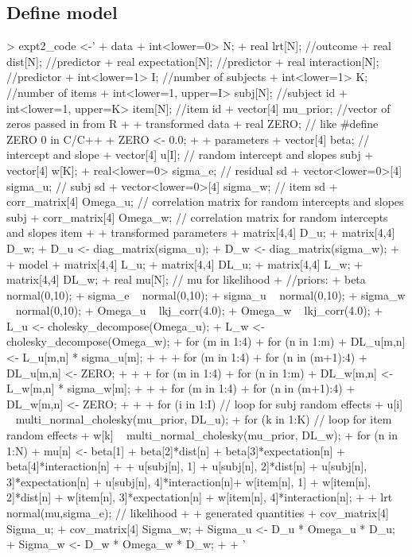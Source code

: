 \documentclass{article}
\begin{document}
\subsection{Define model}

\begin{Schunk}
\begin{Sinput}
> expt2_code <-'
+ data {
+     int<lower=0> N;
+     real lrt[N];                     //outcome
+ real dist[N];                     //predictor
+ real expectation[N];                     //predictor
+ real interaction[N];                     //predictor
+ int<lower=1> I;                 //number of subjects
+ int<lower=1> K;                 //number of items
+ int<lower=1, upper=I> subj[N];    //subject id
+ int<lower=1, upper=K> item[N];    //item id
+ vector[4] mu_prior;             //vector of zeros passed in from R
+ }
+ transformed data {
+ real ZERO;                      // like #define ZERO 0 in C/C++
+ ZERO <- 0.0;
+ }
+ parameters {
+ vector[4] beta;                 // intercept and slope
+ vector[4] u[I];                 // random intercept and slopes subj
+ vector[4] w[K];
+ real<lower=0> sigma_e;          // residual sd
+ vector<lower=0>[4] sigma_u;     // subj sd
+ vector<lower=0>[4] sigma_w;     // item sd
+ corr_matrix[4] Omega_u;           // correlation matrix for random intercepts and slopes subj
+ corr_matrix[4] Omega_w;           // correlation matrix for random intercepts and slopes item
+ }
+ transformed parameters {
+ matrix[4,4] D_u;
+ matrix[4,4] D_w;
+ D_u <- diag_matrix(sigma_u);
+ D_w <- diag_matrix(sigma_w);
+ }
+ model {
+ matrix[4,4] L_u;
+ matrix[4,4] DL_u;
+ matrix[4,4] L_w;
+ matrix[4,4] DL_w;
+ real mu[N]; // mu for likelihood
+ //priors:
+ beta ~ normal(0,10);
+ sigma_e ~ normal(0,10);
+ sigma_u ~ normal(0,10);
+ sigma_w ~ normal(0,10);
+ Omega_u ~ lkj_corr(4.0);
+ Omega_w ~ lkj_corr(4.0);
+ L_u <- cholesky_decompose(Omega_u);
+ L_w <- cholesky_decompose(Omega_w);
+ for (m in 1:4) {
+ for (n in 1:m) {
+ DL_u[m,n] <- L_u[m,n] * sigma_u[m];
+ }
+ }
+ for (m in 1:4){
+ for (n in (m+1):4){
+ DL_u[m,n] <- ZERO;
+ }
+ }
+ for (m in 1:4){
+ for (n in 1:m){
+ DL_w[m,n] <- L_w[m,n] * sigma_w[m];
+ }
+ }
+ for (m in 1:4){
+ for (n in (m+1):4){
+ DL_w[m,n] <- ZERO;
+ }
+ }
+ for (i in 1:I)                  // loop for subj random effects
+ u[i] ~ multi_normal_cholesky(mu_prior, DL_u);
+ for (k in 1:K)                  // loop for item random effects
+ w[k] ~ multi_normal_cholesky(mu_prior, DL_w);    
+ for (n in 1:N) {
+ mu[n] <- beta[1] + beta[2]*dist[n] + beta[3]*expectation[n] + beta[4]*interaction[n] 
+ + u[subj[n], 1] + u[subj[n], 2]*dist[n] + u[subj[n], 3]*expectation[n] + u[subj[n], 4]*interaction[n]+ w[item[n], 1] + w[item[n], 2]*dist[n] + w[item[n], 3]*expectation[n] + w[item[n], 4]*interaction[n];
+ }
+ lrt ~ normal(mu,sigma_e);        // likelihood
+ }
+ generated quantities {
+ cov_matrix[4] Sigma_u;
+ cov_matrix[4] Sigma_w;
+ Sigma_u <- D_u * Omega_u * D_u;
+ Sigma_w <- D_w * Omega_w * D_w;
+ }
+ '
\end{Sinput}
\end{Schunk}
\end{document}
